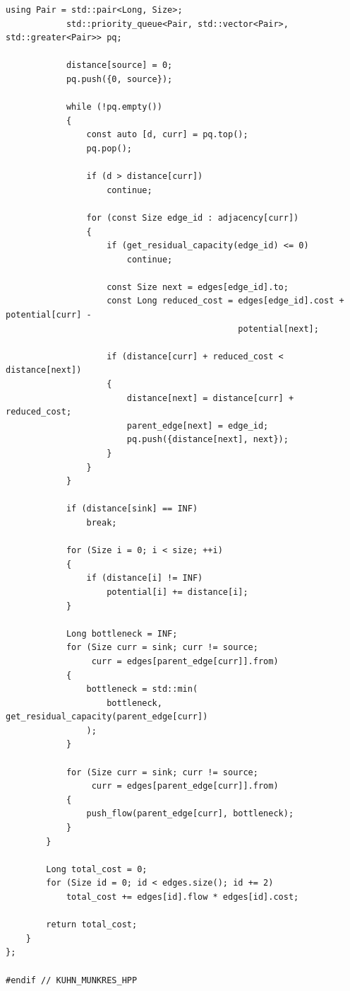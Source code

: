 \begin{lstlisting}[caption={Implementação em C++ do algoritmo Húngaro (Kuhn-Munkres) para atribuição bipartida de custo mínimo.}, label={lst:kuhn_munkres}]
			using Pair = std::pair<Long, Size>;
			std::priority_queue<Pair, std::vector<Pair>, std::greater<Pair>> pq;

			distance[source] = 0;
			pq.push({0, source});

			while (!pq.empty())
			{
				const auto [d, curr] = pq.top();
				pq.pop();

				if (d > distance[curr])
					continue;

				for (const Size edge_id : adjacency[curr])
				{
					if (get_residual_capacity(edge_id) <= 0)
						continue;

					const Size next = edges[edge_id].to;
					const Long reduced_cost = edges[edge_id].cost + potential[curr] -
					                          potential[next];

					if (distance[curr] + reduced_cost < distance[next])
					{
						distance[next] = distance[curr] + reduced_cost;
						parent_edge[next] = edge_id;
						pq.push({distance[next], next});
					}
				}
			}

			if (distance[sink] == INF)
				break;

			for (Size i = 0; i < size; ++i)
			{
				if (distance[i] != INF)
					potential[i] += distance[i];
			}

			Long bottleneck = INF;
			for (Size curr = sink; curr != source;
			     curr = edges[parent_edge[curr]].from)
			{
				bottleneck = std::min(
				    bottleneck, get_residual_capacity(parent_edge[curr])
				);
			}

			for (Size curr = sink; curr != source;
			     curr = edges[parent_edge[curr]].from)
			{
				push_flow(parent_edge[curr], bottleneck);
			}
		}

		Long total_cost = 0;
		for (Size id = 0; id < edges.size(); id += 2)
			total_cost += edges[id].flow * edges[id].cost;

		return total_cost;
	}
};

#endif // KUHN_MUNKRES_HPP
\end{lstlisting}
